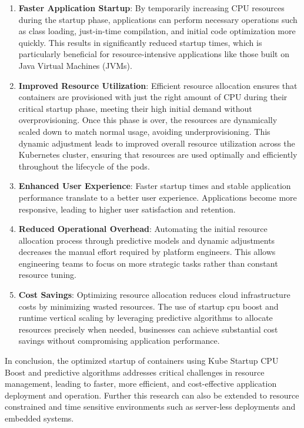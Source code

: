 \begin{enumerate}
    \item \textbf{Faster Application Startup}:
By temporarily increasing CPU resources during the startup phase, applications can perform necessary operations such as class loading, just-in-time compilation, and initial code optimization more quickly. This results in significantly reduced startup times, which is particularly beneficial for resource-intensive applications like those built on Java Virtual Machines (JVMs).

    \item \textbf{Improved Resource Utilization}:
Efficient resource allocation ensures that containers are provisioned with just the right amount of CPU during their critical startup phase, meeting their high initial demand without overprovisioning. Once this phase is over, the resources are dynamically scaled down to match normal usage, avoiding underprovisioning. This dynamic adjustment leads to improved overall resource utilization across the Kubernetes cluster, ensuring that resources are used optimally and efficiently throughout the lifecycle of the pods.

    \item \textbf{Enhanced User Experience}:
Faster startup times and stable application performance translate to a better user experience. Applications become more responsive, leading to higher user satisfaction and retention.

    \item \textbf{Reduced Operational Overhead}:
Automating the initial resource allocation process through predictive models and dynamic adjustments decreases the manual effort required by platform engineers. This allows engineering teams to focus on more strategic tasks rather than constant resource tuning.

    \item \textbf{Cost Savings}:
Optimizing resource allocation reduces cloud infrastructure costs by minimizing wasted resources. The use of startup cpu boost and runtime vertical scaling by leveraging predictive algorithms to allocate resources precisely when needed, businesses can achieve substantial cost savings without compromising application performance.

\end{enumerate}
In conclusion, the optimized startup of containers using Kube Startup CPU Boost and predictive algorithms addresses critical challenges in resource management, leading to faster, more efficient, and cost-effective application deployment and operation.
Further this research can also be extended to resource constrained and time sensitive environments such as server-less deployments and embedded systems.